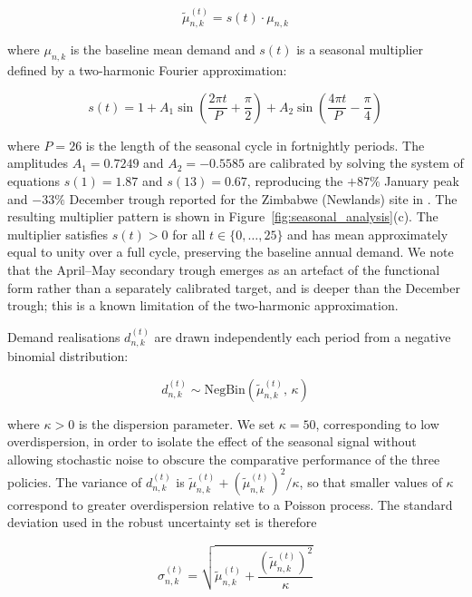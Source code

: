 \documentclass{article}
\begin{document}
\begin{equation}
    \tilde{\mu}_{n,k}^{(t)} = s(t) \cdot \mu_{n,k}
\end{equation}

where $\mu_{n,k}$ is the baseline mean demand and $s(t)$ is a seasonal multiplier defined by a two-harmonic Fourier approximation:

\begin{equation}
    s(t) = 1 + A_1 \sin\!\left(\frac{2\pi t}{P} + \frac{\pi}{2}\right) 
             + A_2 \sin\!\left(\frac{4\pi t}{P} - \frac{\pi}{4}\right)
\end{equation}

where $P = 26$ is the length of the seasonal cycle in fortnightly periods. The amplitudes $A_1 = 0.7249$ and $A_2 = -0.5585$ are calibrated by solving 
the system of equations $s(1) = 1.87$ and $s(13) = 0.67$, reproducing the $+87\%$ January peak and $-33\%$ December trough reported for the Zimbabwe (Newlands) site in \cite{ballif2018}. The resulting multiplier pattern is shown in Figure~\ref{fig:seasonal_analysis}(c). The multiplier satisfies $s(t) > 0$ for all $t \in \{0, \ldots, 25\}$ and has mean approximately equal to unity over a full cycle, preserving the baseline annual demand. We note that the April--May secondary trough emerges as an artefact of the functional form rather than a separately calibrated target, and is deeper than the December trough; this is a known limitation of the two-harmonic approximation.

Demand realisations $d_{n,k}^{(t)}$ are drawn independently each period from a negative binomial distribution:

\begin{equation}
    d_{n,k}^{(t)} \sim \text{NegBin}\!\left(\tilde{\mu}_{n,k}^{(t)},\, \kappa\right)
\end{equation}

where $\kappa > 0$ is the dispersion parameter. We set $\kappa = 50$, corresponding to low overdispersion, in order to isolate the effect of the seasonal signal without allowing stochastic noise to obscure the comparative performance of the three policies. The variance of $d_{n,k}^{(t)}$ is $\tilde{\mu}_{n,k}^{(t)} + \left(\tilde{\mu}_{n,k}^{(t)}\right)^2 / \kappa$, so that smaller values of $\kappa$ correspond to greater overdispersion relative to a Poisson process. The standard deviation used in the robust uncertainty set is therefore

\begin{equation}
    \sigma_{n,k}^{(t)} = \sqrt{\tilde{\mu}_{n,k}^{(t)} + \frac{\left(\tilde{\mu}_{n,k}^{(t)}\right)^2}{\kappa}}
    \label{eq:sigma}
\end{equation}
\end{document}
